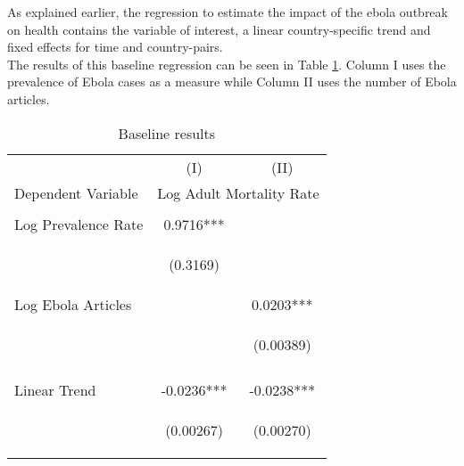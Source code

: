 \documentclass{article}
\begin{document}
As explained earlier, the regression to estimate the impact of the ebola outbreak on health contains the variable of interest, a linear country-specific trend and fixed effects for time and country-pairs.\\
The results of this baseline regression can be seen in Table \ref{Baseline results}. Column I uses the prevalence of Ebola cases as a measure while Column II uses the number of Ebola articles.

\begin{center}
\begin{table}[htbp]\centering  \caption{Baseline results \label{Baseline results}}
\begin{tabular}{lcc} \hline
 & (I) & (II) \\
Dependent Variable & \multicolumn{2}{c}{Log Adult Mortality Rate} \\ \hline
\vspace{4pt} & \begin{footnotesize}\end{footnotesize} & \begin{footnotesize}\end{footnotesize} \\
Log Prevalence Rate & 0.9716*** &  \\
\vspace{4pt} & \begin{footnotesize}(0.3169)\end{footnotesize} & \begin{footnotesize}\end{footnotesize} \\
Log Ebola Articles &  & 0.0203*** \\
 & \begin{footnotesize}\end{footnotesize} & \begin{footnotesize}(0.00389)\end{footnotesize} \\
\vspace{4pt} & \begin{footnotesize}\end{footnotesize} & \begin{footnotesize}\end{footnotesize} \\
Linear Trend & -0.0236*** & -0.0238*** \\
\vspace{4pt} & \begin{footnotesize}(0.00267)\end{footnotesize} & \begin{footnotesize}(0.00270)\end{footnotesize} \\

\end{tabular}
\end{table}
\end{center}
\end{document}

